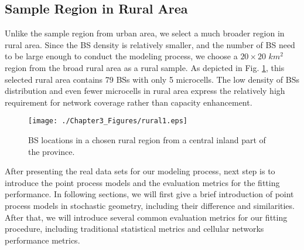 \subsection*{Sample Region in Rural Area}
Unlike the sample region from urban area, we select a much broader region in rural area. Since the BS density is relatively smaller, and the number of BS need to be large enough to conduct the modeling process, we choose a $20\times20$ $km^2$ region from the broad rural area as a rural sample. As depicted in Fig. \ref{c3:rural1}, this selected rural area contains 79 BSs with only 5 microcells. The low density of BSs distribution and even fewer microcells in rural area express the relatively high requirement for network coverage rather than capacity enhancement.

\begin{figure}[!htb]
\centering
\texttt{[image: ./Chapter3\_Figures/rural1.eps]}
\caption{BS locations in a chosen rural region from a central inland part of the province.}
\label{c3:rural1}
\end{figure}

After presenting the real data sets for our modeling process, next step is to introduce the point process models and the evaluation metrics for the fitting performance. In following sections, we will first give a brief introduction of point process models in stochastic geometry, including their difference and similarities. After that, we will introduce several common evaluation metrics for our fitting procedure, including traditional statistical metrics and cellular networks performance metrics.
